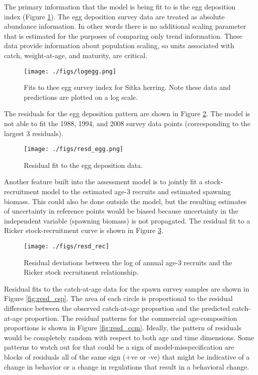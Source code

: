 \documentclass[12pt,letterpaper]{article}
\begin{document}
  The primary information that the model is being fit to is the egg deposition index (Figure \ref{fig:logegg}).  The egg deposition survey data are treated as absolute abundance information.  In other words there is no additional scaling parameter that is estimated for the purposes of comparing only trend information.  These data provide information about population scaling, so units associated with catch, weight-at-age, and maturity, are critical.

  \begin{figure}[tb]
    \centering
    \texttt{[image: ./figs/logegg.png]}
    \caption{Fits to thee egg survey index for Sitka herring. Note these data and predictions are plotted on a log scale.}
    \label{fig:logegg}
  \end{figure}

  The residuals for the egg deposition pattern are shown in Figure \ref{fig:resd_egg}.  The model is not able to fit the 1988, 1994, and 2008 survey data points (corresponding to the largest 3 residuals).

  \begin{figure}[tb]
    \centering
    \texttt{[image: ./figs/resd\_egg.png]}
    \caption{Residual fit to the egg deposition data.}
    \label{fig:resd_egg}
  \end{figure}


  Another feature built into the assessment model is to jointly fit a stock-recruitment model to the estimated age-3 recruits and estimated spawning biomass.  This could also be done outside the model, but the resulting estimates of uncertainty in reference points would be biased because uncertainty in the independent variable (spawning biomass) is not propagated. The residual fit to a Ricker stock-recruitment curve is shown in Figure \ref{fig:resd_rec}.


  \begin{figure}[tb]
    \centering
    \texttt{[image: ./figs/resd\_rec]}
    \caption{Residual deviations between the log of annual age-3 recruits and the Ricker stock recruitment relationship.}
    \label{fig:resd_rec}
  \end{figure}

  Residual fits to the catch-at-age data for the spawn survey samples are shown in Figure \ref{fig:resd_csp}.  The area of each circle is proportional to the residual difference between the observed catch-at-age proportion and the predicted catch-at-age proportion. The residual patterns for the commercial age-composition proportions is shown in Figure \ref{fig:resd_ccm}. Ideally, the pattern of residuals would be completely random with respect to both age and time dimensions.  Some patterns to watch out for that could be a sign of model-misspecification are blocks of residuals all of the same sign (+ve or -ve) that might be indicative of a change in behavior or a change in regulations that result in a behavioral change.
\end{document}
